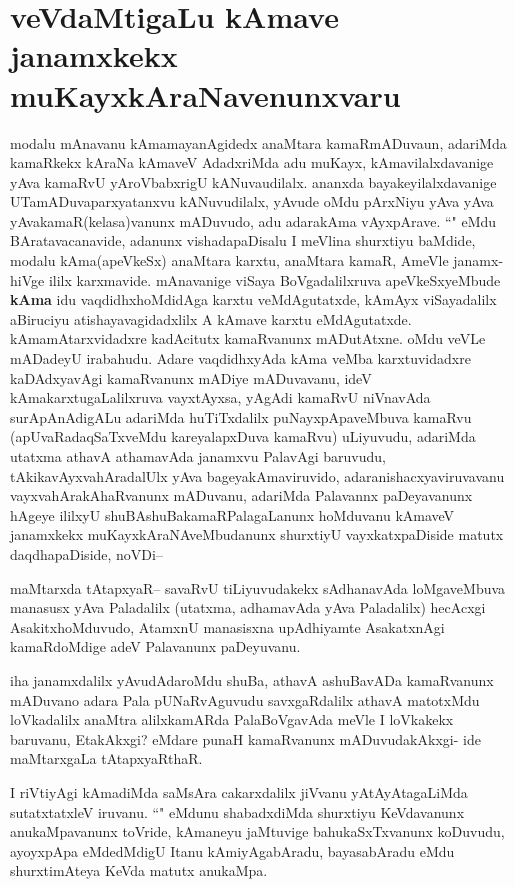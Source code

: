 \section*{veVdaMtigaLu kAmave janamxkekx muKayxkAraNavenunxvaru}
\begin{artha}
modalu mAnavanu kAmamayanAgidedx anaMtara kamaRmADuvaun, adariMda kamaRkekx kAraNa kAmaveV AdadxriMda adu muKayx, kAmavilalxdavanige yAva kamaRvU yAroVbabxrigU kANuvaudilalx. ananxda bayakeyilalxdavanige UTamADuvaparxyatanxvu kANuvudilalx, yAvude oMdu pArxNiyu  yAva yAva yAvakamaR(kelasa)vanunx mADuvudo, adu adarakAma vAyxpArave. ``\stext" eMdu BAratavacanavide, adanunx vishadapaDisalu I meVlina shurxtiyu baMdide, modalu kAma(apeVkeSx) anaMtara karxtu, anaMtara kamaR, AmeVle janamx-hiVge ililx karxmavide.
mAnavanige viSaya BoVgadalilxruva apeVkeSxyeMbude \textbf{kAma} idu vaqdidhxhoMdidAga karxtu veMdAgutatxde, kAmAyx viSayadalilx aBiruciyu atishayavagidadxlilx A kAmave karxtu eMdAgutatxde. kAmamAtarxvidadxre kadAcitutx kamaRvanunx mADutAtxne. oMdu veVLe  mADadeyU irabahudu. Adare vaqdidhxyAda kAma veMba karxtuvidadxre kaDAdxyavAgi kamaRvanunx mADiye mADuvavanu, ideV kAmakarxtugaLalilxruva vayxtAyxsa, yAgAdi kamaRvU niVnavAda surApAnAdigALu adariMda huTiTxdalilx puNayxpApaveMbuva kamaRvu (apUvaRadaqSaTxveMdu kareyalapxDuva kamaRvu) uLiyuvudu, adariMda utatxma athavA athamavAda janamxvu PalavAgi baruvudu, tAkikavAyxvahAradalUlx yAva bageyakAmaviruvido, adaranishacxyaviruvavanu vayxvahArakAhaRvanunx mADuvanu, adariMda Palavannx paDeyavanunx hAgeye ililxyU shuBAshuBakamaRPalagaLanunx hoMduvanu kAmaveV janamxkekx muKayxkAraNAveMbudanunx shurxtiyU vayxkatxpaDiside matutx daqdhapaDiside, noVDi--
\end{artha}

\begin{artha}
maMtarxda tAtapxyaR-- savaRvU tiLiyuvudakekx sAdhanavAda loMgaveMbuva manasusx yAva Paladalilx (utatxma, adhamavAda yAva Paladalilx) hecAcxgi AsakitxhoMduvudo, AtamxnU manasisxna upAdhiyamte AsakatxnAgi kamaRdoMdige adeV Palavanunx paDeyuvanu.

iha janamxdalilx yAvudAdaroMdu shuBa, athavA ashuBavADa kamaRvanunx mADuvano adara Pala pUNaRvAguvudu savxgaRdalilx athavA matotxMdu loVkadalilx anaMtra alilxkamARda PalaBoVgavAda meVle I loVkakekx baruvanu, EtakAkxgi? eMdare punaH kamaRvanunx mADuvudakAkxgi- ide maMtarxgaLa tAtapxyaRthaR.
\end{artha}

\begin{artha}
I riVtiyAgi kAmadiMda saMsAra cakarxdalilx jiVvanu yAtAyAtagaLiMda sutatxtatxleV iruvanu. ``\stext" eMdunu shabadxdiMda shurxtiyu KeVdavanunx anukaMpavanunx toVride, kAmaneyu jaMtuvige bahukaSxTxvanunx koDuvudu, ayoyxpApa eMdedMdigU Itanu kAmiyAgabAradu, bayasabAradu eMdu shurxtimAteya KeVda matutx anukaMpa.
\end{artha}

